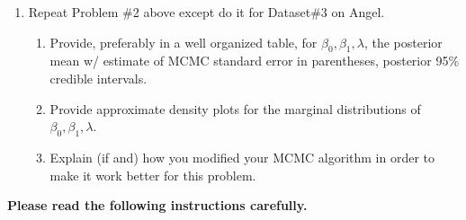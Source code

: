 \documentclass[11pt]{article}
\begin{document}
\begin{enumerate}
\item Repeat Problem \#2 above except do it for Dataset\#3 on
  Angel. 
\begin{enumerate}
\item Provide, preferably in a well organized table, for $\beta_0,
  \beta_1, \lambda$, the posterior mean w/ estimate of MCMC standard
  error in parentheses, posterior 95\% credible intervals.
\item Provide approximate density plots for the marginal distributions of $\beta_0, \beta_1, \lambda$. 
\item Explain (if and) how you modified your MCMC algorithm in order
  to make it work better for this problem.
\end{enumerate}
\end{enumerate}

{\bf Please read the following instructions carefully.}
\end{document}
